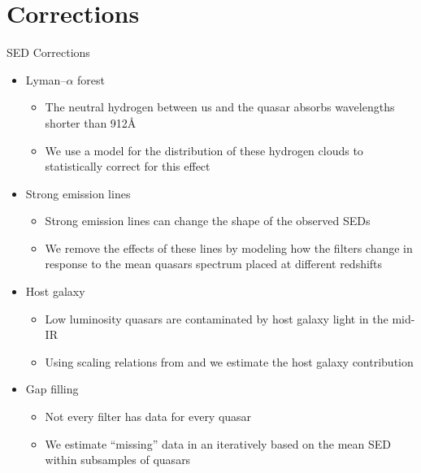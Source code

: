 \documentclass[landscape,9pt]{beamer}
\begin{document}
\section{Corrections}
\begin{frame}
	\begin{block}{SED Corrections}
	\begin{itemize}
		\item Lyman--$\alpha$ forest
		\begin{itemize}
			\item The neutral hydrogen between us and the quasar absorbs wavelengths shorter than 912\AA
			\item We use a model for the distribution of these hydrogen clouds to statistically correct for this effect
		\end{itemize}
		\item Strong emission lines
		\begin{itemize}
			\item Strong emission lines can change the shape of the observed SEDs
			\item We remove the effects of these lines by modeling how the filters change in response to the mean quasars spectrum placed at different redshifts
		\end{itemize}
		\item Host galaxy
		\begin{itemize}
			\item Low luminosity quasars are contaminated by host galaxy light in the mid-IR
			\item Using scaling relations from \citet{Shen:2011} and \citet{Richards:2006} we estimate the host galaxy contribution
		\end{itemize}
		\item Gap filling
		\begin{itemize}
			\item Not every filter has data for every quasar
			\item We estimate ``missing'' data in an iteratively based on the mean SED within subsamples of quasars
		\end{itemize}
	\end{itemize}
	\end{block}
\end{frame}
\end{document}

